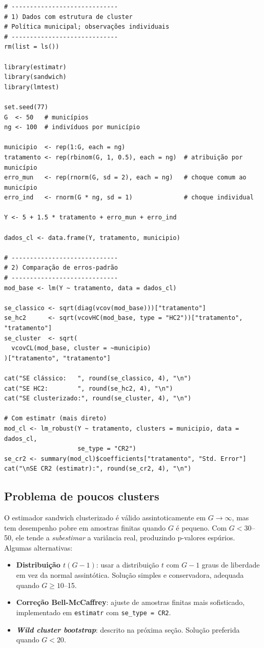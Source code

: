 \begin{lstlisting}[style=Rstyle, caption={Erros clusterizados com sandwich e estimatr}]
# -----------------------------
# 1) Dados com estrutura de cluster
# Política municipal; observações individuais
# -----------------------------
rm(list = ls())

library(estimatr)
library(sandwich)
library(lmtest)

set.seed(77)
G  <- 50   # municípios
ng <- 100  # indivíduos por município

municipio  <- rep(1:G, each = ng)
tratamento <- rep(rbinom(G, 1, 0.5), each = ng)  # atribuição por município
erro_mun   <- rep(rnorm(G, sd = 2), each = ng)   # choque comum ao município
erro_ind   <- rnorm(G * ng, sd = 1)              # choque individual

Y <- 5 + 1.5 * tratamento + erro_mun + erro_ind

dados_cl <- data.frame(Y, tratamento, municipio)

# -----------------------------
# 2) Comparação de erros-padrão
# -----------------------------
mod_base <- lm(Y ~ tratamento, data = dados_cl)

se_classico <- sqrt(diag(vcov(mod_base)))["tratamento"]
se_hc2      <- sqrt(vcovHC(mod_base, type = "HC2"))["tratamento", "tratamento"]
se_cluster  <- sqrt(
  vcovCL(mod_base, cluster = ~municipio)
)["tratamento", "tratamento"]

cat("SE clássico:   ", round(se_classico, 4), "\n")
cat("SE HC2:        ", round(se_hc2, 4), "\n")
cat("SE clusterizado:", round(se_cluster, 4), "\n")

# Com estimatr (mais direto)
mod_cl <- lm_robust(Y ~ tratamento, clusters = municipio, data = dados_cl,
                    se_type = "CR2")
se_cr2 <- summary(mod_cl)$coefficients["tratamento", "Std. Error"]
cat("\nSE CR2 (estimatr):", round(se_cr2, 4), "\n")
\end{lstlisting}

\subsection*{Problema de poucos clusters}

O estimador sandwich clusterizado é válido assintoticamente em $G \to \infty$, mas tem desempenho pobre em amostras finitas quando $G$ é pequeno. Com $G < 30$--50, ele tende a \textit{subestimar} a variância real, produzindo p-valores espúrios. Algumas alternativas:

\begin{itemize}[leftmargin=*]
  \item \textbf{Distribuição $t(G-1)$}: usar a distribuição $t$ com $G-1$ graus de liberdade em vez da normal assintótica. Solução simples e conservadora, adequada quando $G \geq 10$--15.
  \item \textbf{Correção Bell-McCaffrey}: ajuste de amostras finitas mais sofisticado, implementado em \texttt{estimatr} com \texttt{se\_type = \textquotedbl CR2\textquotedbl}.
  \item \textbf{\textit{Wild cluster bootstrap}}: descrito na próxima seção. Solução preferida quando $G < 20$.
\end{itemize}

